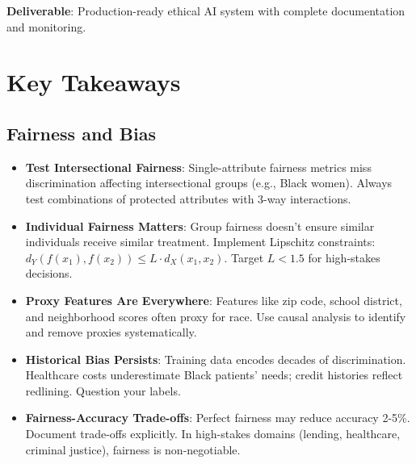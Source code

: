 \textbf{Deliverable}: Production-ready ethical AI system with complete documentation and monitoring.

\section{Key Takeaways}

\subsection{Fairness and Bias}
\begin{itemize}
    \item \textbf{Test Intersectional Fairness}: Single-attribute fairness metrics miss discrimination affecting intersectional groups (e.g., Black women). Always test combinations of protected attributes with 3-way interactions.
    \item \textbf{Individual Fairness Matters}: Group fairness doesn't ensure similar individuals receive similar treatment. Implement Lipschitz constraints: $d_Y(f(x_1), f(x_2)) \leq L \cdot d_X(x_1, x_2)$. Target $L < 1.5$ for high-stakes decisions.
    \item \textbf{Proxy Features Are Everywhere}: Features like zip code, school district, and neighborhood scores often proxy for race. Use causal analysis to identify and remove proxies systematically.
    \item \textbf{Historical Bias Persists}: Training data encodes decades of discrimination. Healthcare costs underestimate Black patients' needs; credit histories reflect redlining. Question your labels.
    \item \textbf{Fairness-Accuracy Trade-offs}: Perfect fairness may reduce accuracy 2-5\%. Document trade-offs explicitly. In high-stakes domains (lending, healthcare, criminal justice), fairness is non-negotiable.
\end{itemize}


